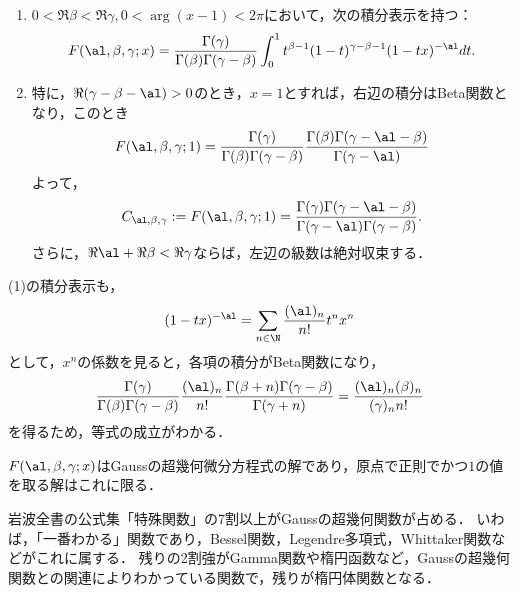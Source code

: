 \documentclass[uplatex,dvipdfmx]{jsreport}
\begin{document}
\begin{proposition}\mbox{}
    \begin{enumerate}
        \item $0<\Re\beta<\Re\gamma,0<\arg(x-1)<2\pi$において，次の積分表示を持つ：
        \[F(\al,\beta,\gamma;x)=\frac{\Gamma(\gamma)}{\Gamma(\beta)\Gamma(\gamma-\beta)}\int^1_0t^{\beta-1}(1-t)^{\gamma-\beta-1}(1-tx)^{-\al}dt.\]
        \item 特に，$\Re(\gamma-\beta-\al)>0$のとき，$x=1$とすれば，右辺の積分はBeta関数となり，このとき
        \[F(\al,\beta,\gamma;1)=\frac{\Gamma(\gamma)}{\Gamma(\beta)\Gamma(\gamma-\beta)}\frac{\Gamma(\beta)\Gamma(\gamma-\al-\beta)}{\Gamma(\gamma-\al)}\]
        よって，
        \[C_{\al,\beta,\gamma}:=F(\al,\beta,\gamma;1)=\frac{\Gamma(\gamma)\Gamma(\gamma-\al-\beta)}{\Gamma(\gamma-\al)\Gamma(\gamma-\beta)}.\]
        さらに，$\Re\al+\Re\beta<\Re\gamma$ならば，左辺の級数は絶対収束する．
    \end{enumerate}
\end{proposition}
\begin{remark}
    (1)の積分表示も，
    \[(1-tx)^{-\al}=\sum_{n\in\N}\frac{(\al)_n}{n!}t^nx^n\]
    として，$x^n$の係数を見ると，各項の積分がBeta関数になり，
    \[\frac{\Gamma(\gamma)}{\Gamma(\beta)\Gamma(\gamma-\beta)}\frac{(\al)_n}{n!}\frac{\Gamma(\beta+n)\Gamma(\gamma-\beta)}{\Gamma(\gamma+n)}=\frac{(\al)_n(\beta)_n}{(\gamma)_nn!}\]
    を得るため，等式の成立がわかる．
\end{remark}

\begin{proposition}[Riemann]
    $F(\al,\beta,\gamma;x)$はGaussの超幾何微分方程式の解であり，原点で正則でかつ$1$の値を取る解はこれに限る．
\end{proposition}

\begin{history}
    岩波全書の公式集「特殊関数」の7割以上がGaussの超幾何関数が占める．
    いわば，「一番わかる」関数であり，Bessel関数，Legendre多項式，Whittaker関数などがこれに属する．
    残りの2割強がGamma関数や楕円函数など，Gaussの超幾何関数との関連によりわかっている関数で，残りが楕円体関数となる．
\end{history}
\end{document}
